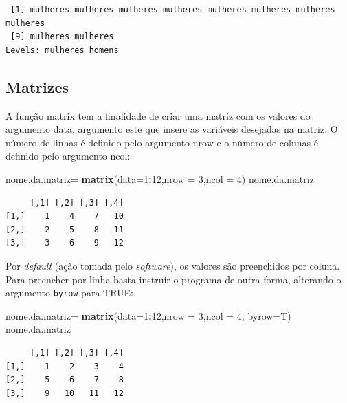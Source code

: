 \documentclass[12pt,portuguese,oneside]{book}
\newenvironment{Shaded}{\begin{snugshade}}{\end{snugshade}}
\newcommand{\KeywordTok}[1]{\textcolor[rgb]{0.13,0.29,0.53}{\textbf{#1}}}
\newcommand{\DataTypeTok}[1]{\textcolor[rgb]{0.13,0.29,0.53}{#1}}
\newcommand{\DecValTok}[1]{\textcolor[rgb]{0.00,0.00,0.81}{#1}}
\newcommand{\StringTok}[1]{\textcolor[rgb]{0.31,0.60,0.02}{#1}}
\newcommand{\OperatorTok}[1]{\textcolor[rgb]{0.81,0.36,0.00}{\textbf{#1}}}
\newcommand{\NormalTok}[1]{#1}
\begin{document}
\begin{verbatim}
 [1] mulheres mulheres mulheres mulheres mulheres mulheres mulheres mulheres
 [9] mulheres mulheres
Levels: mulheres homens
\end{verbatim}

\subsection{Matrizes}\label{matrizes}

A função matrix tem a finalidade de criar uma matriz com os valores do
argumento data, argumento este que insere as variáveis desejadas na
matriz. O número de linhas é definido pelo argumento nrow e o número de
colunas é definido pelo argumento ncol:

\begin{Shaded}
\begin{Highlighting}[]
\NormalTok{nome.da.matriz=}\StringTok{ }\KeywordTok{matrix}\NormalTok{(}\DataTypeTok{data=}\DecValTok{1}\OperatorTok{:}\DecValTok{12}\NormalTok{,}\DataTypeTok{nrow =} \DecValTok{3}\NormalTok{,}\DataTypeTok{ncol =} \DecValTok{4}\NormalTok{)}
\NormalTok{nome.da.matriz}
\end{Highlighting}
\end{Shaded}

\begin{verbatim}
     [,1] [,2] [,3] [,4]
[1,]    1    4    7   10
[2,]    2    5    8   11
[3,]    3    6    9   12
\end{verbatim}

Por \emph{default} (ação tomada pelo \emph{software}), os valores são
preenchidos por coluna. Para preencher por linha basta instruir o
programa de outra forma, alterando o argumento \texttt{byrow} para TRUE:

\begin{Shaded}
\begin{Highlighting}[]
\NormalTok{nome.da.matriz=}\StringTok{ }\KeywordTok{matrix}\NormalTok{(}\DataTypeTok{data=}\DecValTok{1}\OperatorTok{:}\DecValTok{12}\NormalTok{,}\DataTypeTok{nrow =} \DecValTok{3}\NormalTok{,}\DataTypeTok{ncol =} \DecValTok{4}\NormalTok{, }\DataTypeTok{byrow=}\NormalTok{T)}
\NormalTok{nome.da.matriz}
\end{Highlighting}
\end{Shaded}

\begin{verbatim}
     [,1] [,2] [,3] [,4]
[1,]    1    2    3    4
[2,]    5    6    7    8
[3,]    9   10   11   12
\end{verbatim}
\end{document}
